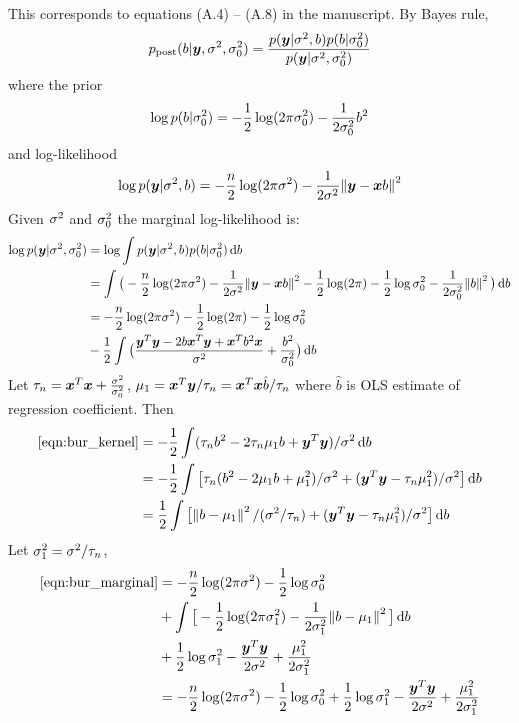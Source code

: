 This corresponds to equations (A.4) -- (A.8) in the manuscript. By Bayes rule,
\begin{equation}
    p_\text{post}(b|\bm y, \sigma^2, \sigma^2_0) = \frac{p(\bm y|\sigma^2,b)p(b|\sigma^2_0)}{p(\bm y|\sigma^2, \sigma^2_0)}
\end{equation}
where the prior
\begin{equation}
    \log p(b|\sigma^2_0) = -\frac{1}{2}\log (2\pi\sigma^2_0) - \frac{1}{2\sigma^2_0}b^2
\end{equation}
and log-likelihood
\begin{equation}
\log p(\bm y|\sigma^2, b) = -\frac{n}{2}\log(2\pi\sigma^2) - \frac{1}{2\sigma^2}\norm{\bm y - \bm x b}^2
\end{equation}
Given $\sigma^2$ and $\sigma^2_0$ the marginal log-likelihood is:
\begin{align}
    \log p(\vy|\rv, \rv_0) &= \log \int p(\vy|\rv, b) p(b|\rv_0)\dif b \label{eqn:bur_marginal}\\
    & = \int \big(-\frac{n}{2} \log(2\pi\rv) - \frac{1}{2\rv}\norm{\vy-\vx b}^2 - \frac{1}{2}\log(2\pi) - \frac{1}{2}\log\rv_0 - \frac{1}{2\rv_0}\norm{b}^2\big)\dif b \\
    & = -\frac{n}{2}\log (2\pi\rv) - \frac{1}{2}\log(2\pi) - \frac{1}{2}\log \rv_0 \\
    & -\frac{1}{2} \int \big( \frac{\vy^T\vy - 2b\vx^T\vy + \vx^T b^2\vx}{\rv} + \frac{b^2}{\rv_0}\big) \dif b \label{eqn:bur_kernel}
\end{align}
Let $\tau_n = \bm x^T\bm x + \frac{\sigma^2}{\sigma^2_0}$, $\mu_1 = \bm x^T\bm y / \tau_n = \bm x^T\bm x \hat{b} / \tau_n$ where $\hat{b}$ is OLS estimate of regression coefficient. Then
\begin{align}
    \eqref{eqn:bur_kernel} &= -\frac{1}{2}\int (\tau_nb^2 - 2\tau_n \mu_1 b + \vy^T\vy) / \rv \dif b \\ 
    &= -\frac{1}{2}\int \big[ \tau_n(b^2 - 2\mu_1 b + \mu_1^2) / \rv + (\vy^T\vy - \tau_n\mu_1^2) / \rv \big] \dif b \\ 
    &= \frac{1}{2} \int \big[\norm{b-\mu_1}^2 / (\rv/\tau_n) + (\vy^T\vy - \tau_n\mu_1^2) / \rv \big] \dif b
\end{align}
Let $\sigma^2_1 = \sigma^2 / \tau_n$, 
\begin{align}
    \eqref{eqn:bur_marginal} &= -\frac{n}{2}\log(2\pi\rv) - \frac{1}{2} \log \rv_0 \\
    &+ \int \big[-\frac{1}{2} \log(2\pi\rv_1) - \frac{1}{2\rv_1}\norm{b-\mu_1}^2 \big] \dif b \\
    &+ \frac{1}{2}\log \rv_1 - \frac{\vy^T\vy}{2\rv} + \frac{\mu_1^2}{2\rv_1} \\
    &= -\frac{n}{2}\log(2\pi\rv) - \frac{1}{2} \log \rv_0 + \frac{1}{2}\log \rv_1 - \frac{\vy^T\vy}{2\rv} + \frac{\mu_1^2}{2\rv_1} \label{eqn:bur_marginal_result}
\end{align}
